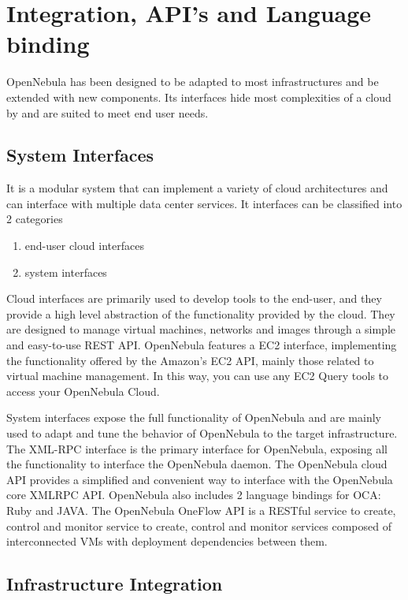 \documentclass[9pt,twocolumn,twoside]{styles/osajnl}
\begin{document}
\section{Integration, API's and Language binding}

OpenNebula has been designed to be adapted to most 
infrastructures and be extended with new components. Its 
interfaces hide most complexities of a cloud by and are suited to meet 
end user needs.

\subsection{System Interfaces}
It is a modular system that can implement a variety of cloud 
architectures and can interface with multiple data center services. 
It interfaces can be classified into 2 categories

\begin{enumerate}
	\item end-user cloud interfaces
	\item system interfaces
\end{enumerate}

Cloud interfaces are primarily used to develop tools to the end-user, 
and they provide a high level abstraction of the functionality 
provided by the cloud. They are designed to manage virtual machines, 
networks and images through a simple and easy-to-use REST API. OpenNebula 
features a EC2 interface, implementing the functionality offered by the 
Amazon's EC2 API, mainly those related to virtual machine management. 
In this way, you can use any EC2 Query tools to access your OpenNebula 
Cloud.

{System interfaces}\cite{www-opennebula-systeminterfaces} expose the 
full functionality of OpenNebula and are 
mainly used to adapt and tune the behavior of OpenNebula to the 
target infrastructure. The XML-RPC interface is the primary interface 
for OpenNebula, exposing all the functionality to interface the 
OpenNebula daemon. The OpenNebula cloud API provides a simplified and 
convenient way to interface with the OpenNebula core XMLRPC API. 
OpenNebula also includes 2 language bindings for OCA: Ruby and JAVA. 
The OpenNebula OneFlow API is a RESTful service to create, control 
and monitor service to create, control and monitor services composed 
of interconnected VMs with deployment dependencies between them.

\subsection{Infrastructure Integration}
\end{document}
